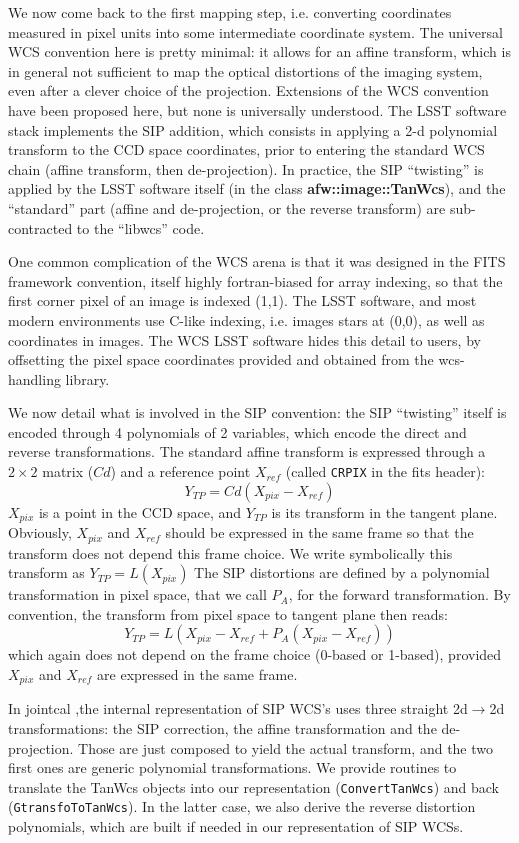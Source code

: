 \documentclass[a4paper,12pt]{scrartcl}
\newcommand{\ClName}[1]{{\bf #1}}
\newcommand{\RoutineName}[1]{\texttt{#1}}
\def\bf{\normalfont\bfseries}
\begin{document}
We now come back to the first mapping step, i.e. converting
coordinates measured in pixel units into some intermediate coordinate
system.  The universal WCS convention here is pretty minimal: it
allows for an affine transform, which is in general not sufficient to
map the optical distortions of the imaging system, even after a clever
choice of the projection. Extensions of the WCS convention have been
proposed here, but none is universally understood. The LSST software
stack implements the SIP addition, which consists in applying a 2-d
polynomial transform to the CCD space coordinates, prior to entering
the standard WCS chain (affine transform, then de-projection). In practice,
the SIP ``twisting'' is applied by the LSST software itself 
(in the class \ClName{afw::image::TanWcs}), and 
the ``standard'' part (affine and de-projection, or the reverse transform)
are sub-contracted to the ``libwcs'' code. 

One common complication of the WCS arena is that it was designed
in the FITS framework convention, itself highly fortran-biased
for array indexing, so that the first corner pixel of an image is 
indexed (1,1). The LSST software, and most modern environments use
C-like indexing, i.e. images stars at (0,0), as well as coordinates
in images. The WCS LSST software hides this detail to users, by
offsetting the pixel space coordinates provided and obtained from
the wcs-handling library.

We now detail what is involved in the SIP convention: the SIP
``twisting'' itself is encoded through 4 polynomials of 2 variables,
which encode the direct and reverse transformations. The standard
affine transform is expressed through a $2\times 2$ matrix ($Cd$) and
a reference point $X_{ref}$ (called \verb'CRPIX' in the fits header):
$$
 Y_{TP} = Cd (X_{pix} - X_{ref})
$$
$X_{pix}$ is a point in the CCD
space, and $Y_{TP}$ is its transform in the tangent plane. Obviously,
$X_{pix}$ and $ X_{ref}$ should be expressed in the same frame so that
the transform does not depend this frame choice. We write symbolically
this transform as $ Y_{TP} = L(X_{pix})$
The SIP distortions are defined by a polynomial transformation
in pixel space, that we call $P_A$, for the forward transformation.
By convention, the transform from pixel space to tangent plane then
reads:
$$
 Y_{TP} = L\left( X_{pix} - X_{ref} + P_A( X_{pix} - X_{ref}) \right )
$$
which again does not depend on the frame choice (0-based or 1-based),
provided $X_{pix}$ and $X_{ref}$ are expressed in the same frame.

In jointcal ,the internal representation of SIP WCS's uses three
straight 2d$\rightarrow$2d transformations: the SIP correction, the
affine transformation and the de-projection. Those are just composed
to yield the actual transform, and the two first ones are generic
polynomial transformations. We provide routines to translate the
TanWcs objects into our representation (\RoutineName{ConvertTanWcs})
and back (\RoutineName{GtransfoToTanWcs}). In the latter case, we also
derive the reverse distortion polynomials, which are built if needed
in our representation of SIP WCSs.
\end{document}
